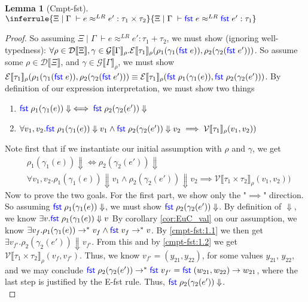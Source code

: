 \documentclass[twoside,11pt,openright]{report}
\newtheorem{lemma}[theorem]{Lemma}
\theoremstyle{definition}
\newcommand{\Keyword}[1]{{\color{blue} \mathsf{#1}}}
\newcommand{\varB}{y}
\newcommand{\expr}{e}
\newcommand{\val}{v}
\newcommand{\valB}{w}
\newcommand{\Fst}{\Keyword{fst}\;}
\newcommand{\Tprod}[2]{#1 \times #2}
\newcommand{\Tsum}[2]{#1 + #2}
\newcommand{\typ}{\tau}
\newcommand{\venv}{\Gamma}
\newcommand{\tenv}{\Xi}
\newcommand{\jdgRel}[6]{#1 \; | \; #2 \; \vdash #3 \approx^{#4} #5 : #6}
\newcommand{\step}{\rightarrow}
\newcommand{\stepS}{\rightarrow^*}
\newcommand{\ValInp}[2]{\mathcal{V} \llbracket #1 \rrbracket_{#2}}
\newcommand{\ValInpGen}[2]{\ValInp{#1}{#2}(\val_1, \val_2)}
\newcommand{\ExpInp}[2]{\mathcal{E} \llbracket #1 \rrbracket_{#2}}
\newcommand{\VenvInp}[2]{\mathcal{G} \llbracket #1 \rrbracket_{#2}}
\newcommand{\TenvInp}[1]{\mathcal{D} \llbracket #1 \rrbracket}
\newcommand{\LogRel}[5]{\jdgRel{#1}{#2}{#3}{LR}{#4}{#5}}
\begin{document}
\begin{lemma}[Cmpt-fst]
  $\inferrule
  { \LogRel{\tenv}{\venv}{\expr}{\expr'}{\Tprod{\typ_1}{\typ_2}} }
  { \LogRel{\tenv}{\venv}{\Fst \expr}{\Fst \expr'}{\typ_1} }$
\end{lemma}
\begin{proof}
  So assuming $\LogRel{\tenv}{\venv}{\expr}{\expr'}{\Tsum{\typ_1}{\typ_2}}$, we must show (ignoring well-typedness): $\forall \rho \in \TenvInp{\tenv}, \gamma \in \VenvInp{\venv}{\rho} . \ExpInp{\typ_1}{\rho}(\rho_1 ( \gamma_1(\Fst \expr)), \rho_2(\gamma_2(\Fst \expr')))$. So assume some $\rho \in \TenvInp{\tenv}$, and $\gamma \in \VenvInp{\venv}{\rho}$, we must show $\ExpInp{\typ_1}{\rho}(\rho_1 ( \gamma_1(\Fst \expr)), \rho_2(\gamma_2(\Fst \expr'))) \equiv \ExpInp{\typ_1}{\rho}(\Fst \rho_1 ( \gamma_1(\expr)), \Fst \rho_2(\gamma_2(\expr')))$. By definition of our expression interpretation, we must show two things
  \begin{enumerate}
    \item $\Fst \rho_1 ( \gamma_1(\expr)) \Downarrow \iff \Fst \rho_2(\gamma_2(\expr')) \Downarrow$
    \item $\forall \val_1, \val_2 . \Fst \rho_1 ( \gamma_1(\expr)) \Downarrow \val_1 \land \Fst \rho_2(\gamma_2(\expr')) \Downarrow \val_2 \implies \ValInpGen{\typ_1}{\rho})$
  \end{enumerate}
  Note first that if we instantiate our initial assumption with $\rho$ and $\gamma$, we get
  \begin{align}
    &\rho_1(\gamma_1(\expr)) \Downarrow \iff \rho_2(\gamma_2(\expr')) \Downarrow\label{cmpt-fst:1.1}\\
    &\forall \val_1, \val_2 . \rho_1(\gamma_1(\expr)) \Downarrow \val_1 \land \rho_2(\gamma_2(\expr')) \Downarrow \val_2 \implies \ValInpGen{\Tprod{\typ_1}{\typ_2}}{\rho})\label{cmpt-fst:1.2}
  \end{align}
  Now to prove the two goals. For the first part, we show only the "$\implies$" direction. So assuming $\Fst \rho_1 ( \gamma_1(\expr)) \Downarrow$, we must show $\Fst \rho_2(\gamma_2(\expr')) \Downarrow$. By definition of $\Downarrow$, we know $\exists \val . \Fst \rho_1 ( \gamma_1(\expr)) \Downarrow \val$ By corollary \ref{cor:EuC_val} on our assumption, we know $\exists \val_f . \rho_1(\gamma_1(\expr)) \stepS \val_f \land \Fst \val_f \stepS \val$. By \ref{cmpt-fst:1.1} we then get $\exists \val_{f'} . \rho_2(\gamma_2(\expr')) \Downarrow \val_{f'}$. From this and by \ref{cmpt-fst:1.2} we get $\ValInp{\Tprod{\typ_1}{\typ_2}}{\rho}(\val_f, \val_{f'})$. Thus, we know $\val_{f'} = (\varB_{21}, \varB_{22})$, for some values $\varB_{21}$, $\varB_{22}$, and we may conclude $\Fst \rho_2(\gamma_2(\expr')) \stepS \Fst \val_{f'} = \Fst (\valB_{21}, \valB_{22}) \step \valB_{21}$, where the last step is justified by the E-fst rule. Thus, $\Fst \rho_2(\gamma_2(\expr')) \Downarrow$.\\

\end{proof}
\end{document}
